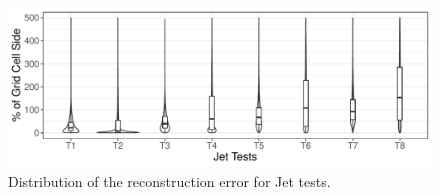 \begin{figure}[!t]
\centering
\includegraphics[width=\linewidth]{Images/Jet_Tests.pdf}
\caption{Distribution of the reconstruction error for Jet tests.}
\label{fig:jet_plot}
\end{figure}
